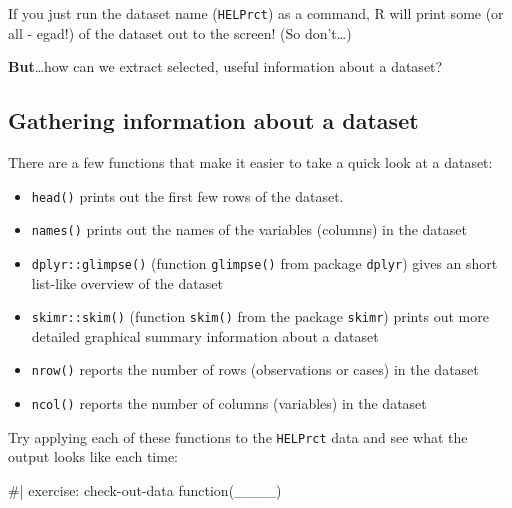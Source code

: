 \documentclass[
  letterpaper,
  DIV=11,
  numbers=noendperiod]{scrreprt}
\newenvironment{Shaded}{\begin{snugshade}}{\end{snugshade}}
\newcommand{\NormalTok}[1]{\textcolor[rgb]{0.00,0.23,0.31}{#1}}
\providecommand{\tightlist}{%
  \setlength{\itemsep}{0pt}\setlength{\parskip}{0pt}}\usepackage{longtable,booktabs,array}
\theoremstyle{remark}
\begin{document}
If you just run the dataset name (\texttt{HELPrct}) as a command, R will
print some (or all - egad!) of the dataset out to the screen! (So
don't\ldots)

\textbf{But}\ldots how can we extract selected, useful information about
a dataset?

\subsection{Gathering information about a
dataset}\label{gathering-information-about-a-dataset}

There are a few functions that make it easier to take a quick look at a
dataset:

\begin{itemize}
\tightlist
\item
  \texttt{head()} prints out the first few rows of the dataset.
\item
  \texttt{names()} prints out the names of the variables (columns) in
  the dataset
\item
  \texttt{dplyr::glimpse()} (function \texttt{glimpse()} from package
  \texttt{dplyr}) gives an short list-like overview of the dataset
\item
  \texttt{skimr::skim()} (function \texttt{skim()} from the package
  \texttt{skimr}) prints out more detailed graphical summary information
  about a dataset
\item
  \texttt{nrow()} reports the number of rows (observations or cases) in
  the dataset
\item
  \texttt{ncol()} reports the number of columns (variables) in the
  dataset
\end{itemize}

Try applying each of these functions to the \texttt{HELPrct} data and
see what the output looks like each time:

\begin{Shaded}
\begin{Highlighting}[]
\NormalTok{\#| exercise: check{-}out{-}data}
\NormalTok{function(\_\_\_\_)}
\end{Highlighting}
\end{Shaded}
\end{document}
